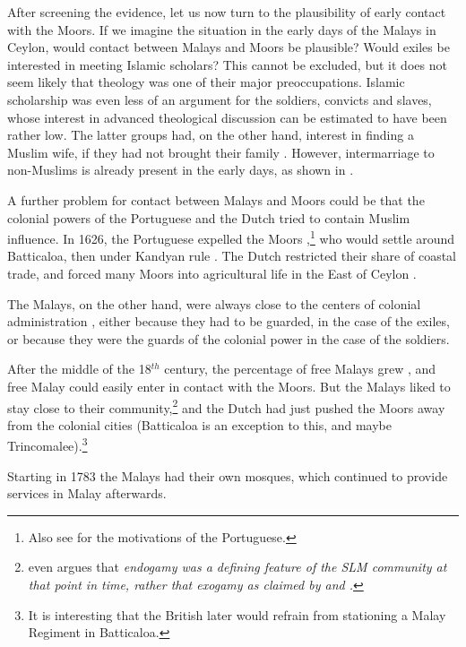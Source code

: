 After screening the evidence, let us now turn to the plausibility of early contact with the Moors.
If we imagine the situation in the early days of the Malays in Ceylon, would contact between Malays and Moors be plausible?  Would exiles be interested in meeting Islamic scholars? This cannot be excluded, but it does not seem likely that theology was one of their major preoccupations. Islamic scholarship was even less of an argument for the soldiers, convicts and slaves, whose interest in advanced theological discussion can be estimated to have been rather low. The latter groups had, on the other hand, interest in finding a Muslim wife, if they had not brought their family \citep[47]{Hussainmiya1990}. However, intermarriage to non-Muslims is already present in the early days, as shown in \citet{ArfinBurah}.

A further problem for contact between Malays and Moors could be that the colonial powers of the Portuguese and the Dutch tried to contain Muslim influence. In 1626, the Portuguese expelled the Moors \citep[84ff]{DeSilva1972},\footnote{Also see \citet[72f]{Vlekke1943} for the motivations of the Portuguese.} who would settle around Batticaloa, then under Kandyan rule \citep[113]{Codrington1926}.
The Dutch  restricted their share of coastal trade, and forced many  Moors into agricultural life in the East of Ceylon \citep[42]{Hussainmiya1990}.

The Malays, on the other hand, were always close to the centers of colonial administration \citep{Ansaldo2009book},  either because they had to be guarded, in the case of the exiles, or because they were the guards of the colonial power in the case of the soldiers.

After the middle of the 18$^{th}$ century, the percentage of free Malays grew \citep[49]{Hussainmiya1990}, and free Malay could easily enter in contact with the Moors. But the Malays liked to stay close to  their community,\footnote{\citet{Ansaldo2009book}  even argues that \em endo\em gamy was a defining feature of the SLM community at that point in time, rather that \em exo\em gamy as claimed by \citet{SmithEtAl2004} and \citet{SmithEtAl2006cll}.} and the Dutch had just pushed the Moors away from the colonial cities (Batticaloa is an exception to this, and maybe Trincomalee).\footnote{It is interesting that the British later would refrain from stationing a Malay Regiment in Batticaloa.}

Starting in 1783 the Malays had their own mosques, which continued to provide services in Malay afterwards.

